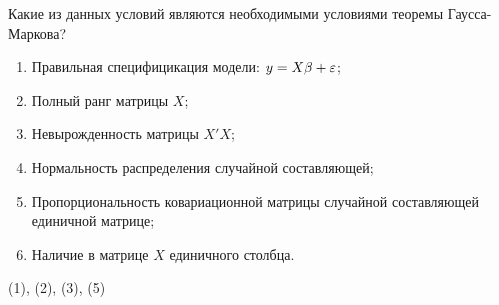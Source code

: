 \begin{problem}
Какие из данных условий являются необходимыми условиями теоремы Гаусса-Маркова?
\begin{enumerate}
\item Правильная специфицикация модели: $y = X\beta + \varepsilon$;
\item Полный ранг матрицы $X$;
\item Невырожденность матрицы $X'X$;
\item Нормальность распределения случайной составляющей;
\item Пропорциональность ковариационной матрицы случайной составляющей единичной матрице;
\item Наличие в матрице $X$ единичного столбца.
\end{enumerate}


\begin{sol}
(1), (2), (3), (5)
\end{sol}
\end{problem}



